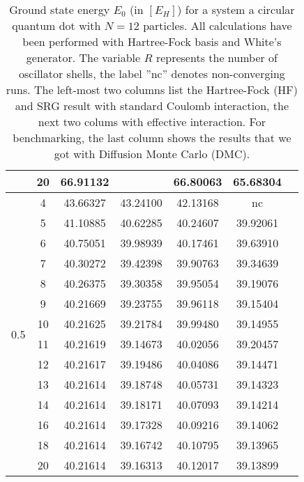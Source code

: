 \begin{table}
\begin{center}
\begin{tabular}{|c|c|c|c|c|c|c|}
& 20&66.91132 & &66.80063 &65.68304 & \\
\hline
\multirow{14}{*}{0.5} & 4&43.66327 &43.24100 &42.13168 & nc& \multirow{14}{*}{} \\
& 5&41.10885 &40.62285 &40.24607 &39.92061 & \\
& 6&40.75051 &39.98939 &40.17461 &39.63910 & \\
& 7&40.30272 &39.42398 &39.90763 &39.34639 & \\
& 8&40.26375 &39.30358 &39.95054 &39.19076 & \\
& 9&40.21669 &39.23755 &39.96118 &39.15404 & \\
& 10&40.21625 &39.21784 &39.99480 &39.14955 & \\
& 11&40.21619 & 39.14673 &40.02056 &39.20457 & \\
& 12&40.21617 &39.19486 & 40.04086 &39.14471 & \\
& 13&40.21614 &39.18748 &40.05731 &39.14323 & \\ 
&14 &40.21614 &39.18171 &40.07093 &39.14214 & \\
&16 &40.21614 &39.17328 &40.09216 &39.14062 & \\
& 18&40.21614 &39.16742 &40.10795 &39.13965 & \\
& 20&40.21614 &39.16313 &40.12017 &39.13899 & \\
\hline
\end{tabular}
\end{center}
\caption{Ground state energy $E_0$ (in $\left[E_H\right]$) for a system a circular quantum dot with $N=12$ particles. All calculations have been performed with Hartree-Fock basis and White's generator. The variable $R$ represents the number of oscillator shells, the label ''nc'' denotes non-converging runs. The left-most two columns list the Hartree-Fock (HF) and SRG result with standard Coulomb interaction, the next two colums with effective interaction.
For benchmarking, the last column shows the results that we got with Diffusion Monte Carlo (DMC).}
\label{tab:fulltab5}
\end{table}


